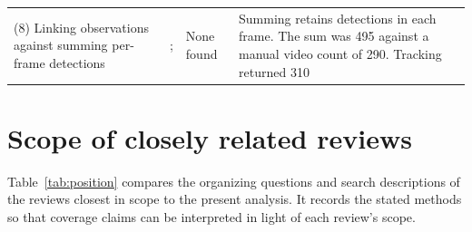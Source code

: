 \documentclass[a4paper,11pt]{article}
\begin{document}
\begin{footnotesize}
\begin{longtable}{@{}L{2.8cm}L{3.6cm}L{3.5cm}L{5.0cm}@{}}
\addlinespace
(8) Linking observations against summing per-frame detections & \citet{hu2023fruit}; \citet{louis2025automated} & None found & Summing retains detections in each frame. The sum was 495 against a manual video count of 290. Tracking returned 310 \citep{hu2023fruit}\\
\end{longtable}
\end{footnotesize}

\section{Scope of closely related reviews}

Table~\ref{tab:position} compares the organizing questions and search descriptions of the reviews closest in scope to the present analysis. It records the stated methods so that coverage claims can be interpreted in light of each review's scope.
\end{document}

